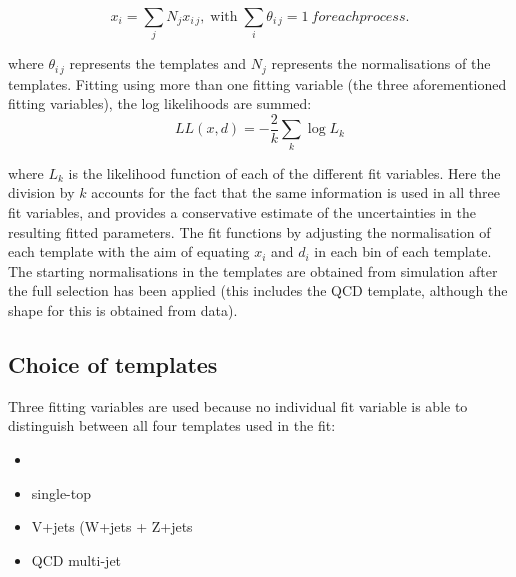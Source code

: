 \begin{equation}
\label{eq:sum_mc}
x_i = \sum\limits_{j}N_{j}x_{i\,j},\;\text{with}\;\sum\limits_{i}\theta_{i\,j}=1\ for each process.
\end{equation}

where $\theta_{i\,j}$ represents the templates and $N_{j}$ represents the normalisations of the templates.
Fitting using more than one fitting variable (the three aforementioned fitting variables), the log likelihoods are summed:
\begin{equation}
\label{eq:log_L_final}
LL\left(x, d\right) = -\frac{2}{k} \sum\limits_{k} \log{L_k}
\end{equation}

where $L_k$ is the likelihood function of each of the different fit variables. Here the division by $k$
accounts for the fact that the same information is used in all three fit variables, and provides a
conservative estimate of the uncertainties in the resulting fitted parameters. The fit functions by adjusting
the normalisation of each template with the aim of equating $x_{i}$ and $d_{i}$ in each bin of each
template. The starting normalisations in the templates are obtained from simulation after the full selection
has been applied (this includes the QCD template, although the shape for this is obtained from data).

\subsection{Choice of templates}
\label{choice_of_templates}

Three fitting variables are used because no individual fit variable is able to distinguish between all four
templates used in the fit:

\begin{itemize}
  \item {\ttbar}
  \item{single-top}
  \item{V+jets (W+jets + Z+jets}
  \item{QCD multi-jet} 
\end{itemize}

